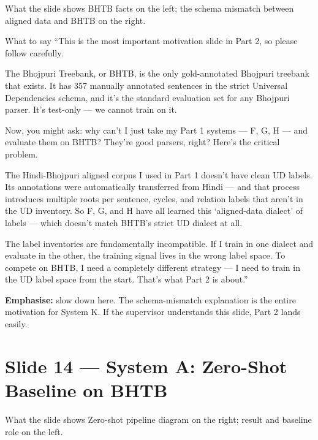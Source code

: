 \documentclass[11pt]{article}
\begin{document}
\begin{pitchbox}{What the slide shows}
BHTB facts on the left; the schema mismatch between aligned data and BHTB on the right.
\end{pitchbox}

\begin{pitchbox}{What to say}
``This is the most important motivation slide in Part 2, so please follow carefully.

The Bhojpuri Treebank, or BHTB, is the only gold-annotated Bhojpuri treebank that exists. It has 357 manually annotated sentences in the strict Universal Dependencies schema, and it's the standard evaluation set for any Bhojpuri parser. It's test-only --- we cannot train on it.

Now, you might ask: why can't I just take my Part 1 systems --- F, G, H --- and evaluate them on BHTB? They're good parsers, right? Here's the critical problem.

The Hindi-Bhojpuri aligned corpus I used in Part 1 doesn't have clean UD labels. Its annotations were automatically transferred from Hindi --- and that process introduces multiple roots per sentence, cycles, and relation labels that aren't in the UD inventory. So F, G, and H have all learned this `aligned-data dialect' of labels --- which doesn't match BHTB's strict UD dialect at all.

The label inventories are fundamentally incompatible. If I train in one dialect and evaluate in the other, the training signal lives in the wrong label space. To compete on BHTB, I need a completely different strategy --- I need to train in the UD label space from the start. That's what Part 2 is about.''
\end{pitchbox}

\begin{tipbox}
\textbf{Emphasise:} slow down here. The schema-mismatch explanation is the entire motivation for System K. If the supervisor understands this slide, Part 2 lands easily.
\end{tipbox}

\section{Slide 14 --- System A: Zero-Shot Baseline on BHTB}

\begin{pitchbox}{What the slide shows}
Zero-shot pipeline diagram on the right; result and baseline role on the left.
\end{pitchbox}
\end{document}
